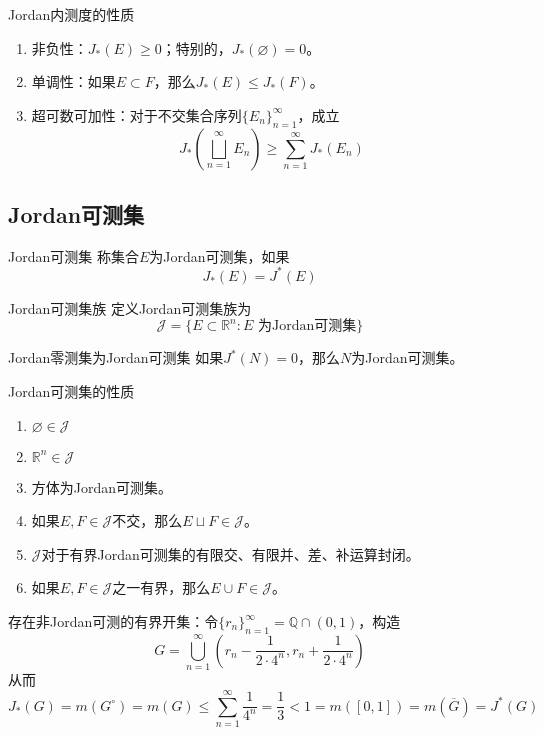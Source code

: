\documentclass[lang = cn, scheme = chinese, thmcnt = section]{elegantbook}
\newcommand{\R}{\mathbb{R}}            %
\newcommand{\Q}{\mathbb{Q}}            %
\newcommand{\sub}{\subset}             %
\begin{document}
\begin{theorem}{Jordan内测度的性质}
	\begin{enumerate}
		\item 非负性：$J_*(E)\ge 0$；特别的，$J_*(\varnothing)=0$。
		\item 单调性：如果$E\sub F$，那么$J_*(E)\le J_*(F)$。
		\item 超可数可加性：对于不交集合序列$\{ E_n \}_{n=1}^{\infty}$，成立
		$$
		J_*\left(\bigsqcup_{n=1}^{\infty}{E_n}\right)\ge\sum_{n=1}^{\infty}{J_*(E_n)}
		$$
	\end{enumerate}
\end{theorem}

\subsection{Jordan可测集}

\begin{definition}{Jordan可测集}
	称集合$E$为Jordan可测集，如果
	$$
	J_*(E)=J^*(E)
	$$
\end{definition}

\begin{definition}{Jordan可测集族}
	定义Jordan可测集族为
	$$
	\mathscr{J}=\{ E\sub\R^n:E\text{ 为Jordan可测集} \}
	$$
\end{definition}

\begin{theorem}{Jordan零测集为Jordan可测集}
	如果$J^*(N)=0$，那么$N$为Jordan可测集。
\end{theorem}

\begin{theorem}{Jordan可测集的性质}
	\begin{enumerate}
		\item $\varnothing\in\mathscr{J}$
		\item $\R^n\in\mathscr{J}$
		\item 方体为Jordan可测集。
		\item 如果$E,F\in \mathscr{J}$不交，那么$E\sqcup F\in \mathscr{J}$。
		\item $\mathscr{J}$对于有界Jordan可测集的有限交、有限并、差、补运算封闭。
		\item 如果$E,F\in \mathscr{J}$之一有界，那么$E\cup F\in \mathscr{J}$。
	\end{enumerate}
\end{theorem}

\begin{note}
	存在非Jordan可测的有界开集：令$\{ r_n \}_{n=1}^{\infty}=\Q\cap(0,1)$，构造
	$$
	G=\bigcup_{n=1}^{\infty}\left(r_n-\frac{1}{2\cdot 4^n},r_n+\frac{1}{2\cdot 4^n}\right)
	$$
	从而%
	$$
	J_*(G)=m(G^\circ)=m(G)\le\sum_{n=1}^{\infty}\frac{1}{4^n}=\frac{1}{3}
	<1=m([0,1])=m(\overline{G})=J^*(G)
	$$
\end{note}
\end{document}

